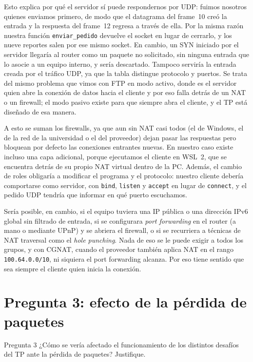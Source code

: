 \documentclass[11pt,a4paper]{article}
\newcommand{\code}[1]{\texttt{#1}}
\begin{document}
Esto explica por qué el servidor sí puede respondernos por UDP: fuimos nosotros quienes enviamos primero, de modo que el datagrama del frame~10 creó la entrada y la respuesta del frame~12 regresa a través de ella. Por la misma razón nuestra función \code{enviar\_pedido} devuelve el socket en lugar de cerrarlo, y los nueve reportes salen por ese mismo socket. En cambio, un SYN iniciado por el servidor llegaría al router como un paquete no solicitado, sin ninguna entrada que lo asocie a un equipo interno, y sería descartado. Tampoco serviría la entrada creada por el tráfico UDP, ya que la tabla distingue protocolo y puertos. Se trata del mismo problema que vimos con FTP en modo activo, donde es el servidor quien abre la conexión de datos hacia el cliente y por eso falla detrás de un NAT o un firewall; el modo pasivo existe para que siempre abra el cliente, y el TP está diseñado de esa manera.

A esto se suman los firewalls, ya que aun sin NAT casi todos (el de Windows, el de la red de la universidad o el del proveedor) dejan pasar las respuestas pero bloquean por defecto las conexiones entrantes nuevas. En nuestro caso existe incluso una capa adicional, porque ejecutamos el cliente en WSL~2, que se encuentra detrás de su propio NAT virtual dentro de la PC. Además, el cambio de roles obligaría a modificar el programa y el protocolo: nuestro cliente debería comportarse como servidor, con \code{bind}, \code{listen} y \code{accept} en lugar de \code{connect}, y el pedido UDP tendría que informar en qué puerto escuchamos.

Sería posible, en cambio, si el equipo tuviera una IP pública o una dirección IPv6 global sin filtrado de entrada, si se configurara \emph{port forwarding} en el router (a mano o mediante UPnP) y se abriera el firewall, o si se recurriera a técnicas de NAT traversal como el \emph{hole punching}. Nada de eso se le puede exigir a todos los grupos, y con CGNAT, cuando el proveedor también aplica NAT en el rango \code{100.64.0.0/10}, ni siquiera el port forwarding alcanza. Por eso tiene sentido que sea siempre el cliente quien inicia la conexión.

\section{Pregunta 3: efecto de la pérdida de paquetes}

\begin{pregunta}{Pregunta 3}
¿Cómo se vería afectado el funcionamiento de los distintos desafíos del TP ante la pérdida de paquetes? Justifique.
\end{pregunta}
\end{document}

